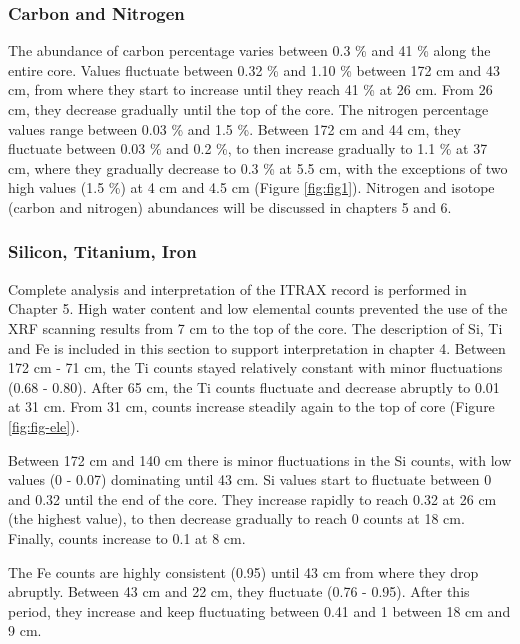 \documentclass[
  12pt,
]{book}
\begin{document}
\hypertarget{carbon-and-nitrogen}{%
\subsubsection{Carbon and Nitrogen}\label{carbon-and-nitrogen}}

The abundance of carbon percentage varies between 0.3 \% and 41 \% along the entire core. Values fluctuate between 0.32 \% and 1.10 \% between 172 cm and 43 cm, from where they start to increase until they reach 41 \% at 26 cm. From 26 cm, they decrease gradually until the top of the core. The nitrogen percentage values range between 0.03 \% and 1.5 \%. Between 172 cm and 44 cm, they fluctuate between 0.03 \% and 0.2 \%, to then increase gradually to 1.1 \% at 37 cm, where they gradually decrease to 0.3 \% at 5.5 cm, with the exceptions of two high values (1.5 \%) at 4 cm and 4.5 cm (Figure \ref{fig:fig1}). Nitrogen and isotope (carbon and nitrogen) abundances will be discussed in chapters 5 and 6.

\hypertarget{silicon-titanium-iron-1}{%
\subsubsection{Silicon, Titanium, Iron}\label{silicon-titanium-iron-1}}

Complete analysis and interpretation of the ITRAX record is performed in Chapter 5. High water content and low elemental counts prevented the use of the XRF scanning results from 7 cm to the top of the core. The description of Si, Ti and Fe is included in this section to support interpretation in chapter 4. Between 172 cm - 71 cm, the Ti counts stayed relatively constant with minor fluctuations (0.68 - 0.80). After 65 cm, the Ti counts fluctuate and decrease abruptly to 0.01 at 31 cm. From 31 cm, counts increase steadily again to the top of core (Figure \ref{fig:fig-ele}).

Between 172 cm and 140 cm there is minor fluctuations in the Si counts, with low values (0 - 0.07) dominating until 43 cm. Si values start to fluctuate between 0 and 0.32 until the end of the core. They increase rapidly to reach 0.32 at 26 cm (the highest value), to then decrease gradually to reach 0 counts at 18 cm. Finally, counts increase to 0.1 at 8 cm.

The Fe counts are highly consistent (0.95) until 43 cm from where they drop abruptly. Between 43 cm and 22 cm, they fluctuate (0.76 - 0.95). After this period, they increase and keep fluctuating between 0.41 and 1 between 18 cm and 9 cm.
\end{document}
